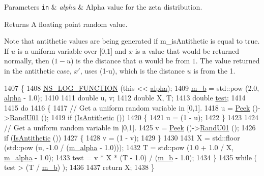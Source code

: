\begin{DoxyParams}[1]{Parameters}
\mbox{\tt in}  & {\em alpha} & Alpha value for the zeta distribution. \\
\hline
\end{DoxyParams}
\begin{DoxyReturn}{Returns}
A floating point random value.
\end{DoxyReturn}
Note that antithetic values are being generated if m\+\_\+is\+Antithetic is equal to true. If $u$ is a uniform variable over \mbox{[}0,1\mbox{]} and $x$ is a value that would be returned normally, then $(1 - u$) is the distance that $u$ would be from $1$. The value returned in the antithetic case, $x'$, uses (1-\/u), which is the distance $u$ is from the 1. 
\begin{DoxyCode}
1407 \{
1408   \hyperlink{log-macros-disabled_8h_a90b90d5bad1f39cb1b64923ea94c0761}{NS\_LOG\_FUNCTION} (\textcolor{keyword}{this} << \hyperlink{lte__uplink__power__control_8m_a62197192f0fbf4e0675eb37be1c4c175}{alpha});
1409   \hyperlink{classns3_1_1ZetaRandomVariable_af07c02d30a8e7ffd8386b8776ef7b3ec}{m\_b} = std::pow (2.0, \hyperlink{lte__uplink__power__control_8m_a62197192f0fbf4e0675eb37be1c4c175}{alpha} - 1.0);
1410 
1411   \textcolor{keywordtype}{double} u, v;
1412   \textcolor{keywordtype}{double} X, T;
1413   \textcolor{keywordtype}{double} \hyperlink{main-test-sync_8cc_a708a4c1a4d0c4acc4c447310dd4db27f}{test};
1414 
1415   \textcolor{keywordflow}{do}
1416     \{
1417       \textcolor{comment}{// Get a uniform random variable in [0,1].}
1418       u = \hyperlink{classns3_1_1RandomVariableStream_ac5aa8d691c061bcc88a909dc9b479222}{Peek} ()->\hyperlink{classns3_1_1RngStream_a46be36426b8bc712e9de468b63558c22}{RandU01} ();
1419       \textcolor{keywordflow}{if} (\hyperlink{classns3_1_1RandomVariableStream_a7bf5175d624b14bd023f8c4f78bc5fd7}{IsAntithetic} ())
1420         \{
1421           u = (1 - u);
1422         \}
1423 
1424       \textcolor{comment}{// Get a uniform random variable in [0,1].}
1425       v = \hyperlink{classns3_1_1RandomVariableStream_ac5aa8d691c061bcc88a909dc9b479222}{Peek} ()->\hyperlink{classns3_1_1RngStream_a46be36426b8bc712e9de468b63558c22}{RandU01} ();
1426       \textcolor{keywordflow}{if} (\hyperlink{classns3_1_1RandomVariableStream_a7bf5175d624b14bd023f8c4f78bc5fd7}{IsAntithetic} ())
1427         \{
1428           v = (1 - v);
1429         \}
1430 
1431       X = std::floor (std::pow (u, -1.0 / (\hyperlink{classns3_1_1ZetaRandomVariable_a48ec2fea5e04864918b734f5ca4e5e07}{m\_alpha} - 1.0)));
1432       T = std::pow (1.0 + 1.0 / X, \hyperlink{classns3_1_1ZetaRandomVariable_a48ec2fea5e04864918b734f5ca4e5e07}{m\_alpha} - 1.0);
1433       test = v * X * (T - 1.0) / (\hyperlink{classns3_1_1ZetaRandomVariable_af07c02d30a8e7ffd8386b8776ef7b3ec}{m\_b} - 1.0);
1434     \}
1435   \textcolor{keywordflow}{while} ( test > (T / \hyperlink{classns3_1_1ZetaRandomVariable_af07c02d30a8e7ffd8386b8776ef7b3ec}{m\_b}) );
1436 
1437   \textcolor{keywordflow}{return} X;
1438 \}
\end{DoxyCode}


